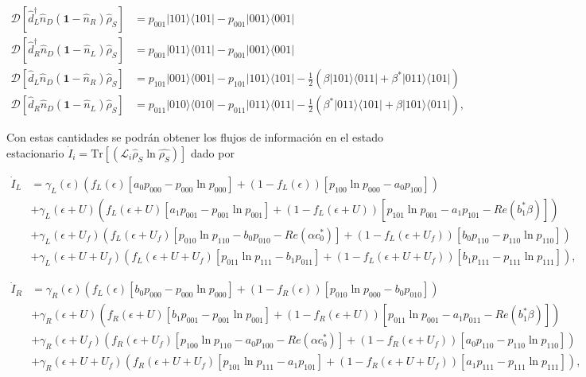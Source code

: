 \begin{appendixs}
\begin{align*}
    \mathcal{D}[\hat{d}^{\dagger}_{L}\hat{n}_{D}(\textbf{1}-\hat{n}_{R})\hat{\rho}_{S}] & = p_{001}|101\rangle \langle 101| - p_{001}|001\rangle \langle 001| \\ 
    \mathcal{D}[\hat{d}^{\dagger}_{R}\hat{n}_{D}(\textbf{1}-\hat{n}_{L})\hat{\rho}_{S}] & = p_{001}|011\rangle \langle 011| - p_{001}|001\rangle \langle 001| \\  
    \mathcal{D}[\hat{d}_{L}\hat{n}_{D}(\textbf{1}-\hat{n}_{R})\hat{\rho}_{S}] & = p_{101}|001\rangle \langle 001| - p_{101}|101\rangle \langle 101| - \frac{1}{2}(\beta |101\rangle \langle 011| + \beta^{*}|011\rangle \langle 101| ) \\ 
    \mathcal{D}[\hat{d}_{R}\hat{n}_{D}(\textbf{1}-\hat{n}_{L})\hat{\rho}_{S}] & = p_{011}|010\rangle \langle 010| - p_{011}|011\rangle \langle 011| - \frac{1}{2}(\beta^{*} |011\rangle \langle 101| + \beta|101\rangle \langle 011|  ),   
\end{align*}

Con estas cantidades se podrán obtener los flujos de información en el estado estacionario $\dot{I}_{i} = \text{Tr}[(\mathcal{L}_{i}\hat{\rho}_{S} \ln \hat{\rho_{S}}) ]$ dado por

\begin{align*}
    \dot{I}_{L} &  =  \gamma_{L}(\epsilon)(f_{L}(\epsilon)[a_{0}p_{000} - p_{000}\ln p_{000}] + (1-f_{L}(\epsilon))[p_{100}\ln p_{000} - a_{0}p_{100} ] )  \\ 
      & + \gamma_{L}(\epsilon + U)(f_{L}(\epsilon + U)[a_{1}p_{001} - p_{001}\ln p_{001}] + (1-f_{L}(\epsilon + U))[p_{101}\ln p_{001} -a_{1}p_{101} - Re(b^{*}_{1}\beta ) ]   ) \\  
      & + \gamma_{L}(\epsilon + U_{f})( f_{L}(\epsilon + U_{f})[p_{010}\ln p_{110} -b_{0}p_{010} - Re(\alpha c^{*}_{0}) ]  + (1-f_{L}(\epsilon + U_{f}))[b_{0}p_{110} - p_{110}\ln p_{110} ] ) \\  
      & + \gamma_{L}(\epsilon + U + U_{f})( f_{L}(\epsilon + U + U_{f})[p_{011}\ln p_{111}- b_{1}p_{011}] + (1-f_{L}(\epsilon+U+U_{f}) )[b_{1}p_{111} - p_{111}\ln p_{111}]  ), 
\end{align*}

\begin{align*}
    \dot{I}_{R} &  =  \gamma_{R}(\epsilon)(f_{L}(\epsilon)[b_{0}p_{000} - p_{000}\ln p_{000}] + (1-f_{R}(\epsilon))[p_{010}\ln p_{000} - b_{0}p_{010} ] )  \\ 
      & + \gamma_{R}(\epsilon + U)(f_{R}(\epsilon + U)[b_{1} p_{001} - p_{001}\ln p_{001}] + (1-f_{R}(\epsilon + U))[p_{011}\ln p_{001} -a_{1}p_{011} - Re(b^{*}_{1}\beta ) ]   ) \\  
      & + \gamma_{R}(\epsilon + U_{f})( f_{R}(\epsilon + U_{f})[p_{100}\ln p_{110} -a_{0}p_{100} - Re(\alpha c^{*}_{0}) ]  + (1-f_{R}(\epsilon + U_{f}))[a_{0}p_{110} - p_{110}\ln p_{110} ] ) \\  
      & + \gamma_{R}(\epsilon + U + U_{f})( f_{R}(\epsilon + U + U_{f})[p_{101}\ln p_{111}- a_{1}p_{101}] + (1-f_{R}(\epsilon+U+U_{f}) )[a_{1}p_{111} - p_{111}\ln p_{111}]  ), 
\end{align*}


\end{appendixs}
